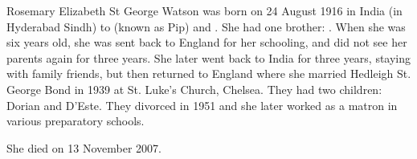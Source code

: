 
Rosemary Elizabeth St George Watson was born on 24 August 1916 in India (in Hyderabad Sindh) to  (known as Pip) and .
She had one brother: .
When she was six years old, she was sent back to England for her schooling, and did not see her parents again for three years. She later went back to India for three years, staying with family friends, but then returned to England where she married Hedleigh St. George Bond in 1939 at St. Luke's Church, Chelsea. They had two children: Dorian and D'Este. They divorced in 1951 and she later worked as a matron in various preparatory schools.

She died on 13 November 2007.
